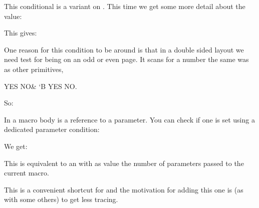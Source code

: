 \startnewprimitive[title={\prm {ifnumval}}]

This conditional is a variant on . This time we get
some more detail about the value:

\stopbuffer

\typebuffer

This gives:

{\getbuffer}

\stopnewprimitive

\startoldprimitive[title={\prm {ifodd}}]

One reason for this condition to be around is that in a double sided layout we
need test for being on an odd or even page. It scans for a number the same was
as other primitives,

\startbuffer
{} YES \else NO\fi &
\ifodd`B YES \else NO\fi .
\stopbuffer

\typebuffer

So: {\inlinebuffer}

\stopoldprimitive

\startnewprimitive[title={\prm {ifparameter}}]

In a macro body  is a reference to a parameter. You can check if one is
set using a dedicated parameter condition:

\startbuffer
\tolerant{}

\foo
\foo[1]
\foo[1][2]
\stopbuffer

\typebuffer

We get:

\getbuffer

\stopnewprimitive

\startnewprimitive[title={\prm {ifparameters}}]

This is equivalent to an  with as value the number of parameters
passed to the current macro.

\stopnewprimitive

\startnewprimitive[title={\prm {ifrelax}}]

This is a convenient shortcut for \typ {\ifx\relax} and the motivation for adding
this one is (as with some others) to get less tracing.

